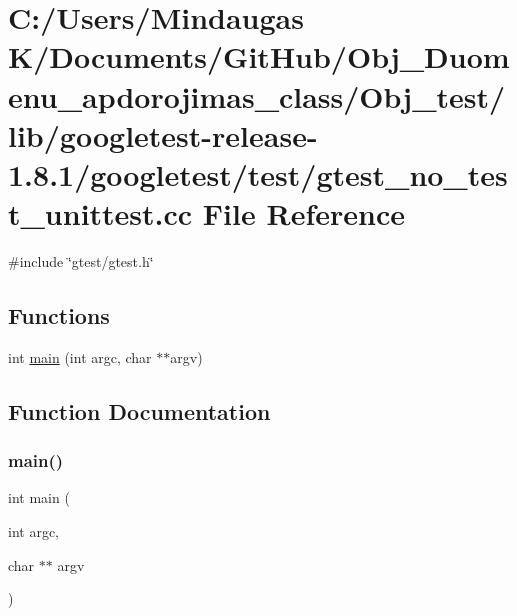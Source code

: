 \hypertarget{_obj__test_2lib_2googletest-release-1_88_81_2googletest_2test_2gtest__no__test__unittest_8cc}{}\section{C\+:/\+Users/\+Mindaugas K/\+Documents/\+Git\+Hub/\+Obj\+\_\+\+Duomenu\+\_\+apdorojimas\+\_\+class/\+Obj\+\_\+test/lib/googletest-\/release-\/1.8.1/googletest/test/gtest\+\_\+no\+\_\+test\+\_\+unittest.cc File Reference}
\label{_obj__test_2lib_2googletest-release-1_88_81_2googletest_2test_2gtest__no__test__unittest_8cc}
{\ttfamily \#include \char`\"{}gtest/gtest.\+h\char`\"{}}\newline
\subsection*{Functions}
\begin{DoxyCompactItemize}
\item 
int \mbox{\hyperlink{_obj__test_2lib_2googletest-release-1_88_81_2googletest_2test_2gtest__no__test__unittest_8cc_a3c04138a5bfe5d72780bb7e82a18e627}{main}} (int argc, char $\ast$$\ast$argv)
\end{DoxyCompactItemize}


\subsection{Function Documentation}
\mbox{\label{_obj__test_2lib_2googletest-release-1_88_81_2googletest_2test_2gtest__no__test__unittest_8cc_a3c04138a5bfe5d72780bb7e82a18e627}} 
\subsubsection{\texorpdfstring{main()}{main()}}
{\footnotesize\ttfamily int main (\begin{DoxyParamCaption}\item[{int}]{argc,  }\item[{char $\ast$$\ast$}]{argv }\end{DoxyParamCaption})}

